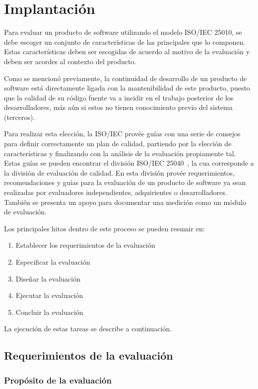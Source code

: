\chapter{Implantación}
Para evaluar un producto de software utilizando el modelo ISO/IEC 25010, se debe escoger un conjunto
de características de las principales que lo componen. Estas características deben ser escogidas de acuerdo
al motivo de la evaluación y deben ser acordes al contexto del producto.

Como se mencionó previamente, la continuidad de desarrollo de un producto de software está directamente
ligada con la mantenibilidad de este producto, puesto que la calidad de su código fuente va a incidir
en el trabajo posterior de los desarrolladores, más aún si estos no tienen conocimiento previo del sistema
(terceros).

Para realizar esta elección, la ISO/IEC provée guías con una serie de consejos para definir correctamente
un plan de calidad, partiendo por la elección de características y finalizando con la análisis de la evaluación
propiamente tal. Estas guías se pueden encontrar el división ISO/IEC 25040~\cite{25040}, la cua corresponde a la división
de evaluación de calidad. En esta división provée requerimientos, recomendaciones y guías para
la evaluación de un producto de software ya sean realizadas por evaluadores independientes, adquirientes o
desarrolladores. También se presenta un apoyo para documentar una medición como un módulo de evaluación.

Los principales hitos dentro de este proceso se pueden resumir en:
\begin{enumerate}
    \item Establecer los requerimientos de la evaluación
    \item Especificar la evaluación
    \item Diseñar la evaluación
    \item Ejecutar la evaluación
    \item Concluir la evaluación
\end{enumerate}

La ejecución de estas tareas se describe a continuación.

\section{Requerimientos de la evaluación}

\subsection{Propósito de la evaluación}

